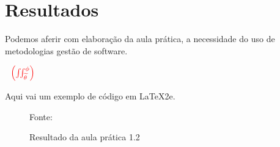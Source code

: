 \section{Resultados}




\par Podemos aferir com elaboração da aula prática, a necessidade do uso de metodologias gestão de software.


$\underline{{\color{Blue} }}{\color{red} \, \: \: \left ( \iint_{\widetilde{ \theta }}^{\phi } \right )}  $



\par Aqui vai um exemplo de código em \LaTeX2e.


\begin{figure}[H] %
  \center
  \caption{Resultado da aula prática 1.2}

  {\fontsize{10pt}{\baselineskip}\selectfont Fonte: }
  \label{fig:ap1_cod_vigual1}
\end{figure}



